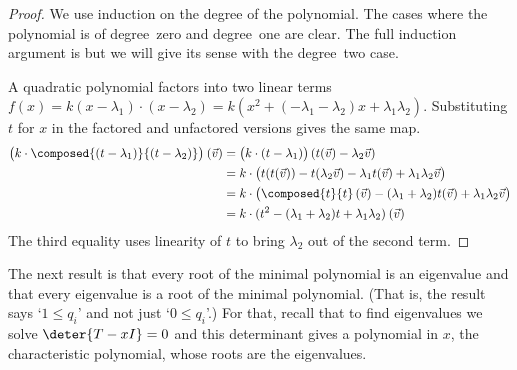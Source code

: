\begin{proof}
We use induction on the degree of the polynomial.
The cases where the polynomial is of
degree~zero and degree~one are clear.
The full induction argument is 
but we will give its sense with the degree~two case.

A quadratic polynomial factors into two
linear terms \( f(x)=k(x-\lambda_1)\cdot(x-\lambda_2)
                    =k(x^2+(-\lambda_1-\lambda_2)x+\lambda_1\lambda_2) \).
Substituting \( t \) 
for \( x \) in the factored and
unfactored versions gives the same map.
\begin{align*}
   \bigl(k\cdot\composed{(t-\lambda_1)}{(t-\lambda_2)}\bigr)\>(\vec{v})
   &=\bigl(k\cdot(t-\lambda_1)\bigr)\,(t(\vec{v})-\lambda_2\vec{v})    \\
   &=k\cdot\bigl(t(t(\vec{v}))-t(\lambda_2\vec{v})
      -\lambda_1 t(\vec{v})+\lambda_1\lambda_2\vec{v}\bigr)    \\
   &=k\cdot \bigl(\composed{t}{t}\,(\vec{v})-(\lambda_1+\lambda_2)t(\vec{v})
          +\lambda_1\lambda_2\vec{v}\bigr)                    \\
   &=k\cdot(t^2-(\lambda_1+\lambda_2)t+\lambda_1\lambda_2)\>(\vec{v})
\end{align*}
The third equality uses linearity of \( t \) to bring $\lambda_2$ out of the
second term.
\end{proof}


The next result is that
every root of the minimal polynomial is an eigenvalue and
that every eigenvalue is a root of the minimal polynomial. 
(That is, the result says `$1\leq q_i$' and 
not just `$0\leq q_i$'.)
For that, recall that to find eigenvalues
we solve $\deter{T-xI}=0$ and 
this determinant gives a polynomial in $x$, 
the characteristic polynomial, 
whose roots are the eigenvalues.

